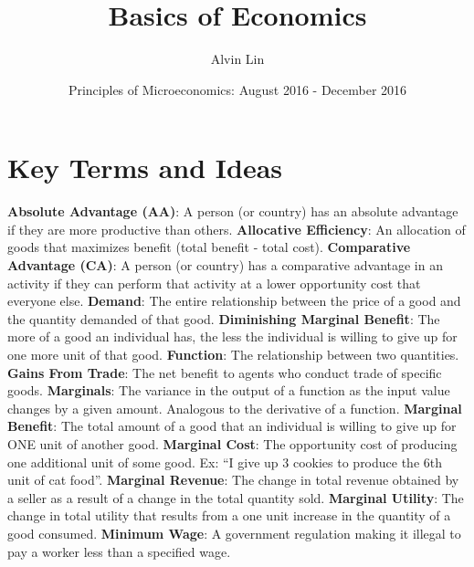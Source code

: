 \documentclass[letterpaper, 12pt]{article}
\title{Basics of Economics}
\author{Alvin Lin}
\date{Principles of Microeconomics: August 2016 - December 2016}
\begin{document}
\maketitle

\section{Key Terms and Ideas}
\textbf{Absolute Advantage (AA)}: A person (or country) has an absolute
advantage if they are more productive than others.
\newline
\textbf{Allocative Efficiency}: An allocation of goods that maximizes benefit
(total benefit - total cost).
\newline
\textbf{Comparative Advantage (CA)}: A person (or country) has a comparative
advantage in an activity if they can perform that activity at a lower
opportunity cost that everyone else.
\newline
\textbf{Demand}: The entire relationship between the price of a good and the
quantity demanded of that good.
\newline
\textbf{Diminishing Marginal Benefit}: The more of a good an individual has,
the less the individual is willing to give up for one more unit of that good.
\newline
\textbf{Function}: The relationship between two quantities.
\newline
\textbf{Gains From Trade}: The net benefit to agents who conduct trade of
specific goods.
\newline
\textbf{Marginals}: The variance in the output of a function as the input value
changes by a given amount. Analogous to the derivative of a function.
\newline
\textbf{Marginal Benefit}: The total amount of a good that an individual is
willing to give up for ONE unit of another good.
\newline
\textbf{Marginal Cost}: The opportunity cost of producing one additional unit
of some good. Ex: ``I give up 3 cookies to produce the 6th unit of cat food''.
\newline
\textbf{Marginal Revenue}: The change in total revenue obtained by a seller
as a result of a change in the total quantity sold.
\newline
\textbf{Marginal Utility}: The change in total utility that results from a
one unit increase in the quantity of a good consumed.
\newline
\textbf{Minimum Wage}: A government regulation making it illegal to pay a
worker less than a specified wage.
\end{document}
